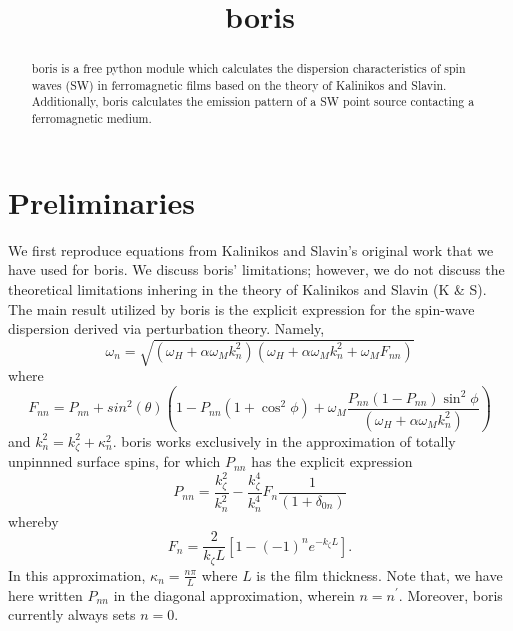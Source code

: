 \documentclass{article}
\title{boris}
\begin{document}
\maketitle
\begin{abstract}
boris is a free python module which calculates the dispersion characteristics of spin waves (SW) in ferromagnetic films based on the theory of Kalinikos and Slavin. Additionally, boris calculates the emission pattern of a SW point source contacting a ferromagnetic medium. 
\end{abstract}
\section{Preliminaries}
We first reproduce equations from Kalinikos and Slavin's original work that we have used for boris. We discuss boris' limitations; however, we do not discuss the theoretical limitations inhering in the theory of Kalinikos and Slavin (K \& S). The main result utilized by boris is the explicit expression for the spin-wave dispersion derived via perturbation theory. Namely,
\begin{equation}\label{dispersion_main}
\omega_{n} = \sqrt{(\omega_{H} + \alpha \omega_{M} k_{n}^2)(\omega_{H} + \alpha \omega_{M} k_{n}^2 + \omega_{M} F_{nn})}
\end{equation}
where
\begin{equation}
F_{nn} = P_{nn} + sin^2(\theta) \left(1 - P_{nn} \left( 1 + \cos^2{\phi}\right) + \omega_{M} \frac{P_{nn}(1-P_{nn})\sin^2{\phi}}{(\omega_{H} + \alpha \omega_{M} k_{n}^2)} \right)
\end{equation}
and $k_{n}^2 = k_{\zeta}^2 + \kappa_{n}^2$. boris works exclusively in the approximation of totally unpinnned surface spins, for which $P_{nn}$ has the explicit expression
\begin{equation}
P_{nn} = \frac{k_{\zeta}^2}{k_{n}^2} - \frac{k_{\zeta}^4}{k_{n}^4} F_{n} \frac{1}{(1 + \delta_{0n})}
\end{equation}
whereby
\begin{equation}
F_{n} = \frac{2}{k_{\zeta}L} [1 - (-1)^n e^{-k_{\zeta}L}].
\end{equation}
In this approximation, $\kappa_{n} = \frac{n \pi}{L}$ where $L$ is the film thickness. Note that, we have here written $P_{nn}$ in the diagonal approximation, wherein $n = n^{\prime}$. Moreover, boris currently always sets $n = 0$.
\end{document}

